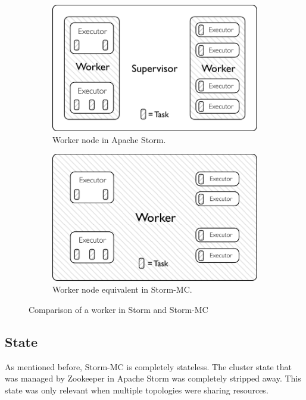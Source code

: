\begin{figure}[!htb]
\centering
\begin{subfigure}{.5\textwidth}
  \centering
  \includegraphics[width=0.95\linewidth]{pdf/distributed_worker.pdf}
  \caption{Worker node in Apache Storm.}
  \label{fig:comparison1}
\end{subfigure}%
\begin{subfigure}{.5\textwidth}
  \centering
  \includegraphics[width=0.95\linewidth]{pdf/local_worker.pdf}
  \caption{Worker node equivalent in Storm-MC.}
  \label{fig:comparison2}
\end{subfigure}
\caption{Comparison of a worker in Storm and Storm-MC}
\label{fig:comparison}
\end{figure}

\subsection{State}

As mentioned before, Storm-MC is completely stateless. The cluster state that was managed by Zookeeper in Apache Storm was completely stripped away. This state was only relevant when multiple topologies were sharing resources.

